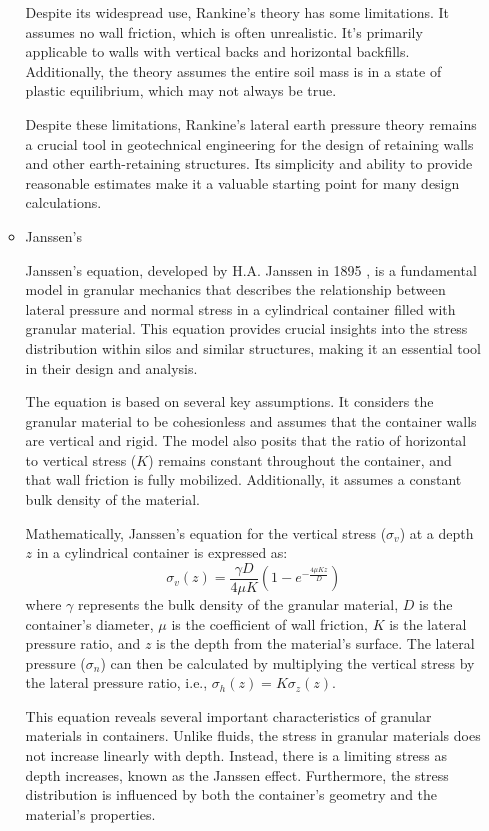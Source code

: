 \documentclass[xcolor=dvipsnames,10pt,hidelinks]{article}
\begin{document}
\begin{itemize}
\begin{itemize}
Despite its widespread use, Rankine's theory has some limitations.
It assumes no wall friction, which is often unrealistic.
It's primarily applicable to walls with vertical backs and horizontal backfills.
Additionally, the theory assumes the entire soil mass is in a state of plastic equilibrium, which may not always be true.

Despite these limitations, Rankine's lateral earth pressure theory remains a crucial tool in geotechnical engineering for the design of retaining walls and other earth-retaining structures.
Its simplicity and ability to provide reasonable estimates make it a valuable starting point for many design calculations.

\item Janssen's

Janssen's equation, developed by H.A. Janssen in 1895 \parencite{janssen1895versuche}, is a fundamental model in granular mechanics
that describes the relationship between lateral pressure and normal stress in a cylindrical container filled with granular material.
This equation provides crucial insights into the stress distribution within silos and similar structures,
making it an essential tool in their design and analysis.

The equation is based on several key assumptions.
It considers the granular material to be cohesionless and assumes that the container walls are vertical and rigid.
The model also posits that the ratio of horizontal to vertical stress (\(K\)) remains constant throughout the container, and that wall friction is fully mobilized.
Additionally, it assumes a constant bulk density of the material.

Mathematically, Janssen's equation for the vertical stress (\(\sigma_v\)) at a depth \(z\) in a cylindrical container is expressed as:
$$ \sigma_v(z) = \frac{\gamma D}{4\mu K} \left(1 - e^{-\frac{4\mu K z}{D}}\right) $$
where \(\gamma\) represents the bulk density of the granular material,
\(D\) is the container's diameter,
\(\mu\) is the coefficient of wall friction,
\(K\) is the lateral pressure ratio, and
\(z\) is the depth from the material's surface.
The lateral pressure (\(\sigma_n\)) can then be calculated by multiplying the vertical stress by the lateral pressure ratio,
i.e., \(\sigma_h (z) = K \sigma_z (z)\).

This equation reveals several important characteristics of granular materials in containers.
Unlike fluids, the stress in granular materials does not increase linearly with depth.
Instead, there is a limiting stress as depth increases, known as the Janssen effect.
Furthermore, the stress distribution is influenced by both the container's geometry and the material's properties.


\end{itemize}
\end{itemize}
\end{document}
